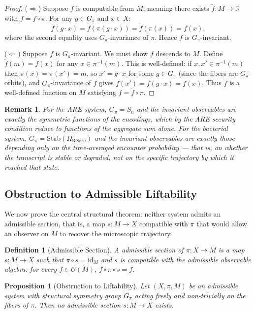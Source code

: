 \documentclass[12pt, a4paper]{article}
\theoremstyle{essaystyle}
\newtheorem{definition}{Definition}
\newtheorem{proposition}{Proposition}
\newtheorem*{remark}{Remark}
\begin{document}
\begin{proof}
($\Rightarrow$) Suppose $f$ is computable from $M$, meaning there exists
$\tilde{f} : M \to \mathbb{R}$ with $f = \tilde{f} \circ \pi$. For any $g \in G_\pi$
and $x \in X$:
\[
f(g \cdot x) = \tilde{f}(\pi(g \cdot x)) = \tilde{f}(\pi(x)) = f(x),
\]
where the second equality uses $G_\pi$-invariance of $\pi$. Hence $f$ is $G_\pi$-invariant.

($\Leftarrow$) Suppose $f$ is $G_\pi$-invariant. We must show $f$ descends to $M$.
Define $\tilde{f}(m) = f(x)$ for any $x \in \pi^{-1}(m)$. This is well-defined: if
$x, x' \in \pi^{-1}(m)$ then $\pi(x) = \pi(x') = m$, so $x' = g \cdot x$ for some
$g \in G_\pi$ (since the fibers are $G_\pi$-orbits), and $G_\pi$-invariance of $f$
gives $f(x') = f(g \cdot x) = f(x)$. Thus $\tilde{f}$ is a well-defined function on $M$
satisfying $f = \tilde{f} \circ \pi$.
\end{proof}

\begin{remark}
For the ARE system, $G_\pi = S_n$ and the invariant observables are exactly the
symmetric functions of the encodings, which by the ARE security condition reduce to
functions of the aggregate sum alone. For the bacterial system,
$G_\pi = \mathrm{Stab}(\Omega_{\mathrm{RNase}})$ and the invariant observables are
exactly those depending only on the time-averaged encounter probability --- that is,
on whether the transcript is stable or degraded, not on the specific trajectory by
which it reached that state.
\end{remark}

\subsection{Obstruction to Admissible Liftability}

We now prove the central structural theorem: neither system admits an admissible
section, that is, a map $s : M \to X$ compatible with $\pi$ that would allow an
observer on $M$ to recover the microscopic trajectory.

\begin{definition}[Admissible Section]
A \emph{admissible section} of $\pi : X \to M$ is a map $s : M \to X$ such that
$\pi \circ s = \mathrm{id}_M$ and $s$ is compatible with the admissible observable
algebra: for every $f \in \mathcal{O}(M)$, $f \circ \pi \circ s = f$.
\end{definition}

\begin{proposition}[Obstruction to Liftability]
Let $(X, \pi, M)$ be an admissible system with structural symmetry group $G_\pi$
acting freely and non-trivially on the fibers of $\pi$. Then no admissible section
$s : M \to X$ exists.
\end{proposition}
\end{document}
